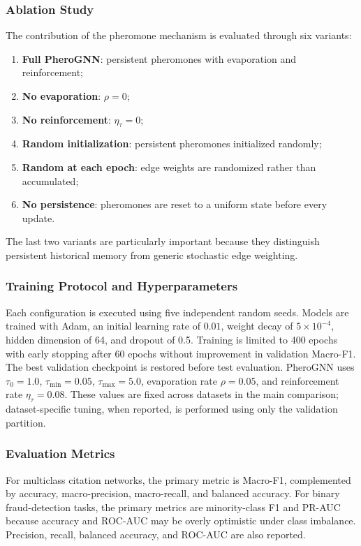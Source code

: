\subsubsection{Ablation Study}

The contribution of the pheromone mechanism is evaluated through six variants:
\begin{enumerate}
    \item \textbf{Full PheroGNN}: persistent pheromones with evaporation and reinforcement;
    \item \textbf{No evaporation}: $\rho=0$;
    \item \textbf{No reinforcement}: $\eta_\tau=0$;
    \item \textbf{Random initialization}: persistent pheromones initialized randomly;
    \item \textbf{Random at each epoch}: edge weights are randomized rather than accumulated;
    \item \textbf{No persistence}: pheromones are reset to a uniform state before every update.
\end{enumerate}
The last two variants are particularly important because they distinguish persistent historical memory from generic stochastic edge weighting.

\subsubsection{Training Protocol and Hyperparameters}
\label{sec:training-protocol}

Each configuration is executed using five independent random seeds. Models are trained with Adam, an initial learning rate of $0.01$, weight decay of $5\times10^{-4}$, hidden dimension of 64, and dropout of 0.5. Training is limited to 400 epochs with early stopping after 60 epochs without improvement in validation Macro-F1. The best validation checkpoint is restored before test evaluation. PheroGNN uses $\tau_0=1.0$, $\tau_{\min}=0.05$, $\tau_{\max}=5.0$, evaporation rate $\rho=0.05$, and reinforcement rate $\eta_\tau=0.08$. These values are fixed across datasets in the main comparison; dataset-specific tuning, when reported, is performed using only the validation partition.

\subsubsection{Evaluation Metrics}

For multiclass citation networks, the primary metric is Macro-F1, complemented by accuracy, macro-precision, macro-recall, and balanced accuracy. For binary fraud-detection tasks, the primary metrics are minority-class F1 and PR-AUC because accuracy and ROC-AUC may be overly optimistic under class imbalance. Precision, recall, balanced accuracy, and ROC-AUC are also reported.


